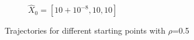 \begin{itemize}
\begin{figure}[H]
\begin{subfigure}[b]{0.45\textwidth}
        \caption{$\hat{X}_{0}=[10+10^{-8},10,10]$}
        \label{fig:lorenz_5}
    \end{subfigure}
    \caption{Trajectories for different starting points with $\rho$=0.5}
    \label{fig:loren_4_5}
\end{figure}
   \end{itemize}
